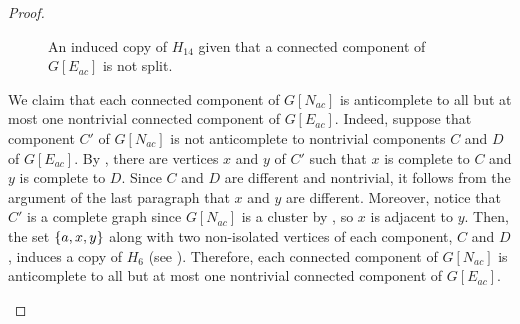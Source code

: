 \begin{proof}
\begin{enumerate}[label=(\roman*)]
\begin{figure}[htb!]
                \caption{An induced copy of $H_{14}$ given that a connected
                    component of $G[E_{ac}]$ is not split.}
                \label{fig:type_3bag_4}
            \end{figure}

            We claim that each connected component of $G[N_{ac}]$ is
            anticomplete to all but at most one nontrivial connected component
            of $G[E_{ac}]$. Indeed, suppose that component $C'$ of $G[N_{ac}]$
            is not anticomplete to nontrivial components $C$ and $D$ of
            $G[E_{ac}]$. By , there are vertices $x$ and $y$ of
            $C'$ such that $x$ is complete to $C$ and $y$ is complete to $D$.
            Since $C$ and $D$ are different and nontrivial, it follows from the
            argument of the last paragraph that $x$ and $y$ are different.
            Moreover, notice that $C'$ is a complete graph since $G[N_{ac}]$ is
            a cluster by , so $x$ is adjacent to $y$. Then, the
            set $\left\{a,x,y\right\}$ along with two non-isolated vertices of each
            component, $C$ and $D$, induces a copy of $H_6$ (see
            ). Therefore, each connected component of
            $G[N_{ac}]$ is anticomplete to all but at most one nontrivial
            connected component of $G[E_{ac}]$.


\end{enumerate}
\end{proof}
